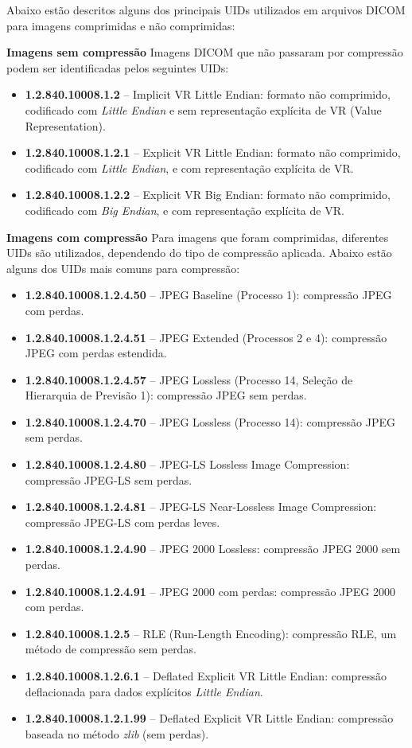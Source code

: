Abaixo estão descritos alguns dos principais UIDs utilizados em arquivos DICOM para imagens comprimidas e não comprimidas:

\noindent \textbf{Imagens sem compressão}
Imagens DICOM que não passaram por compressão podem ser identificadas pelos seguintes UIDs:

\begin{itemize}
    \item \textbf{1.2.840.10008.1.2} – Implicit VR Little Endian: formato não comprimido, codificado com \textit{Little Endian} e sem representação explícita de VR (Value Representation).
    \item \textbf{1.2.840.10008.1.2.1} – Explicit VR Little Endian: formato não comprimido, codificado com \textit{Little Endian}, e com representação explícita de VR.
    \item \textbf{1.2.840.10008.1.2.2} – Explicit VR Big Endian: formato não comprimido, codificado com \textit{Big Endian}, e com representação explícita de VR.
\end{itemize}

\noindent \textbf{Imagens com compressão}
Para imagens que foram comprimidas, diferentes UIDs são utilizados, dependendo do tipo de compressão aplicada. Abaixo estão alguns dos UIDs mais comuns para compressão:

\begin{itemize}
    \item \textbf{1.2.840.10008.1.2.4.50} – JPEG Baseline (Processo 1): compressão JPEG com perdas.
    \item \textbf{1.2.840.10008.1.2.4.51} – JPEG Extended (Processos 2 e 4): compressão JPEG com perdas estendida.
    \item \textbf{1.2.840.10008.1.2.4.57} – JPEG Lossless (Processo 14, Seleção de Hierarquia de Previsão 1): compressão JPEG sem perdas.
    \item \textbf{1.2.840.10008.1.2.4.70} – JPEG Lossless (Processo 14): compressão JPEG sem perdas.
    \item \textbf{1.2.840.10008.1.2.4.80} – JPEG-LS Lossless Image Compression: compressão JPEG-LS sem perdas.
    \item \textbf{1.2.840.10008.1.2.4.81} – JPEG-LS Near-Lossless Image Compression: compressão JPEG-LS com perdas leves.
    \item \textbf{1.2.840.10008.1.2.4.90} – JPEG 2000 Lossless: compressão JPEG 2000 sem perdas.
    \item \textbf{1.2.840.10008.1.2.4.91} – JPEG 2000 com perdas: compressão JPEG 2000 com perdas.
    \item \textbf{1.2.840.10008.1.2.5} – RLE (Run-Length Encoding): compressão RLE, um método de compressão sem perdas.
    \item \textbf{1.2.840.10008.1.2.6.1} – Deflated Explicit VR Little Endian: compressão deflacionada para dados explícitos \textit{Little Endian}.
    \item \textbf{1.2.840.10008.1.2.1.99} – Deflated Explicit VR Little Endian: compressão baseada no método \textit{zlib} (sem perdas).
\end{itemize}

